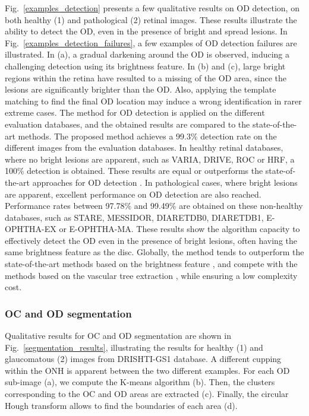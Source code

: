 


\mbox{Fig. \ref{examples_detection}} presents a few qualitative results on OD detection, on both healthy (1) and pathological (2) retinal images. These results illustrate the ability to detect the OD, even in the presence of bright and spread lesions. In \mbox{Fig. \ref{examples_detection_failures}}, a few examples of OD detection failures are illustrated. In (a), a gradual darkening around the OD is observed, inducing a challenging detection using its brightness feature. In (b) and (c), large bright regions within the retina have resulted to a missing of the OD area, since the lesions are significantly brighter than the OD. Also, applying the template matching to find the final OD location may induce a wrong identification in rarer extreme cases.
The method for OD detection is applied on the different evaluation databases, and the obtained results are compared to the state-of-the-art methods. 
The proposed method achieves a 99.3\% detection rate on the different images from the evaluation databases.
In healthy retinal databases, where no bright lesions are apparent, such as VARIA, DRIVE, ROC or HRF, a 100\% detection is obtained. These results are equal or outperforms the state-of-the-art approaches for OD detection \citep{hashim,mahfouz,soares}. In pathological cases, where bright lesions are apparent, excellent performance on OD detection are also reached. Performance rates between 97.78\% and 99.49\% are obtained on these non-healthy databases, such as STARE, MESSIDOR, DIARETDB0, DIARETDB1, E-OPHTHA-EX or E-OPHTHA-MA. These results show the algorithm capacity to effectively detect the OD even in the presence of bright lesions, often having the same brightness feature as the disc. Globally, the method tends to outperform the state-of-the-art methods based on the brightness feature \citep{hashim,pourreza}, and compete with the methods based on the vascular tree extraction \citep{mahfouz,soares,zhang}, while ensuring a low complexity cost.

\subsubsection{OC and OD segmentation}



Qualitative results for OC and OD segmentation are shown in \mbox{Fig. \ref{segmentation_results}}, illustrating the results for healthy (1) and glaucomatous (2) images from DRISHTI-GS1 database. A different cupping within the ONH is apparent between the two different examples. For each OD sub-image (a), we compute the K-means algorithm (b). Then, the clusters corresponding to the OC and OD areas are extracted (c). Finally, the circular Hough transform allows to find the boundaries of each area (d).


